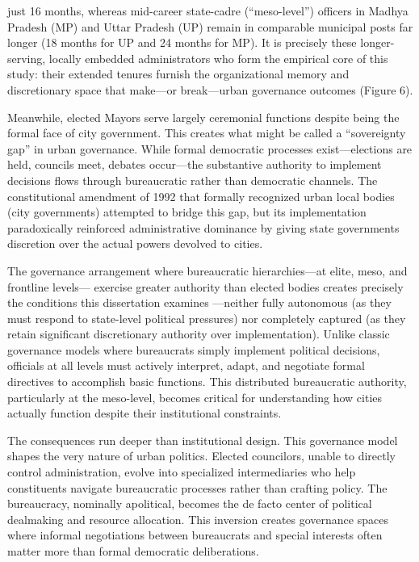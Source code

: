 just 16 months, whereas mid-career state-cadre (“meso-level”) officers in Madhya Pradesh (MP) and Uttar Pradesh (UP) remain in comparable municipal posts far longer (18 months for UP and 24 months for MP). It is precisely these longer-serving, locally embedded administrators who form the empirical core of this study: their extended tenures furnish the organizational memory and discretionary space that make—or break—urban governance outcomes (Figure 6).

Meanwhile, elected Mayors serve largely ceremonial functions despite being the formal face of city government. This creates what might be called a ``sovereignty gap'' in urban governance. While formal democratic processes exist—elections are held, councils meet, debates occur—the substantive authority to implement decisions flows through bureaucratic rather than democratic channels. The constitutional amendment of 1992 that formally recognized urban local bodies (city governments) attempted to bridge this gap, but its implementation paradoxically reinforced administrative dominance by giving state governments discretion over the actual powers devolved to cities.

The governance arrangement where bureaucratic hierarchies—at elite, meso, and frontline levels— exercise greater authority than elected bodies creates precisely the conditions this dissertation examines —neither fully autonomous (as they must respond to state-level political pressures) nor completely captured (as they retain significant discretionary authority over implementation). Unlike classic governance models where bureaucrats simply implement political decisions, officials at all levels must actively interpret, adapt, and negotiate formal directives to accomplish basic functions. This distributed bureaucratic authority, particularly at the meso-level, becomes critical for understanding how cities actually function despite their institutional constraints.

The consequences run deeper than institutional design. This governance model shapes the very nature of urban politics. Elected councilors, unable to directly control administration, evolve into specialized intermediaries who help constituents navigate bureaucratic processes rather than crafting policy. The bureaucracy, nominally apolitical, becomes the de facto center of political dealmaking and resource allocation. This inversion creates governance spaces where informal negotiations between bureaucrats and special interests often matter more than formal democratic deliberations.

